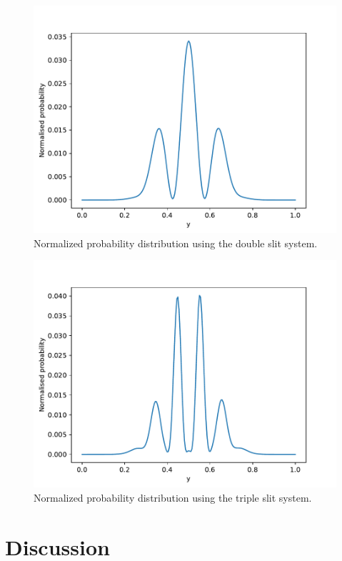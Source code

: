 \documentclass[english,notitlepage,reprint,nofootinbib]{revtex4-2}  %
\begin{document}
	\begin{figure}[h!]
		\centering
		\includegraphics[scale=0.55]{figures/problem9_double_slit.pdf}
		\caption{Normalized probability distribution using the double slit system.}
		\label{fig:prob9_double}
	\end{figure}
	
	\begin{figure}[H]
		\centering
		\includegraphics[scale=0.55]{figures/problem9_triple_slit.pdf}
		\caption{Normalized probability distribution using the triple slit system.}
		\label{fig:prob9_triple}
	\end{figure}

	\section{Discussion}\label{sec:discussion}
\end{document}
